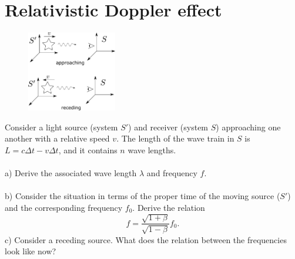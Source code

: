 \documentclass{article}
\begin{document}
    \newpage
    \section{Relativistic Doppler effect}
        \begin{figure}
            \includegraphics[width=0.35\textwidth]{figures/figure_1.pdf}
        \end{figure}
        Consider a light source (system $S'$) and receiver (system $S$) approaching one another with a relative speed $v$. The length of the wave train in $S$ is $L = c \Delta t - v \Delta t$, and it contains $n$ wave lengths. \\ \\
        a) Derive the associated wave length $\lambda$ and frequency $f$. \\ \\
        b) Consider the situation in terms of the proper time of the moving source ($S'$) and the corresponding frequency $f_0$. Derive the relation 
        \begin{equation*}
            f = \frac{\sqrt{1 + \beta}}{\sqrt{1 - \beta}}f_0.
        \end{equation*}
        c) Consider a receding source. What does the relation between the frequencies look like now? 
\end{document}
